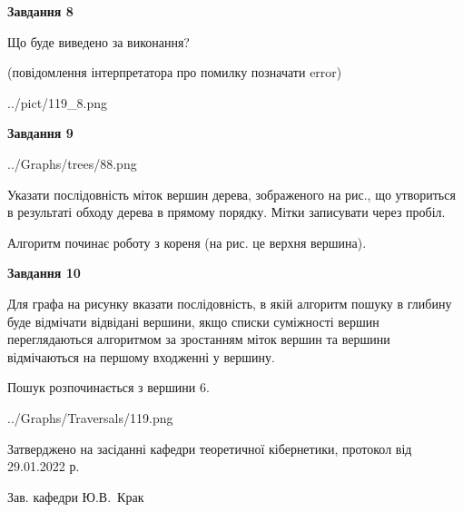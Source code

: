 \documentclass[12pt, ukrainian]{article}
\begin{document}
{\begin {large}
{\begin {center}\textbf{Завдання 8}\end {center}}\par
Що буде виведено за виконання?\par
 (повідомлення інтерпретатора про помилку позначати error)\par
\begin{center}
	{../pict/119_8.png}
\end{center}
\newpage

{\begin {center}\textbf{Завдання 9}\end {center}}\par

\begin{center}
	{../Graphs/trees/88.png}
\end{center}
Указати послідовність міток вершин дерева, зображеного на рис., що утвориться в результаті обходу дерева в прямому порядку. Мітки записувати через пробіл.\par Алгоритм починає роботу з кореня (на рис. це верхня вершина).\par
\newpage

{\begin {center}\textbf{Завдання 10}\end {center}}\par
Для графа на рисунку вказати послідовність, в якій алгоритм пошуку в глибину буде відмічати відвідані вершини, якщо списки суміжності вершин переглядаються алгоритмом за зростанням міток вершин та вершини відмічаються на першому вход\-женні у вершину.\par
Пошук розпочинається з вершини 6.\par

\begin{center}
	{../Graphs/Traversals/119.png}
\end{center}\par
\newpage


\end {large}
}
{\smallskip \begin {small} Затверджено на засіданні кафедри теоретичної кібернетики, протокол  від   29.01.2022 р.\par\smallskip\smallskip
{\parbox {6.5 cm}{Зав. кафедри \dotfill Ю.В.~Крак}} \end{small}}
\end{document}
